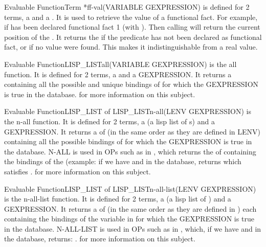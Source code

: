 \begin{typeefa}{Evaluable Function}{Term *}{ff-val}{(VARIABLE GEXPRESSION)}
is defined for 2 terms, a  and a . It is used
to retrieve the value of a functional fact.  For example, if 
has been declared functional fact 1 (with ).  Then
calling  will return the current
 position of the .  It returns the 
 if the predicate has not been declared as functional 
fact, or if no value were found. This makes it indistinguishable from a
 real value.
\end{typeefa}

\begin{typeefa}{Evaluable Function}{LISP\_LIST}{all}{(VARIABLE GEXPRESSION)}
is the all function. It is defined for 2 terms, a  and a
GEXPRESSION.  It returns a  containing all the possible and
unique bindings of  for which the GEXPRESSION is true in the
database.  for more information on
this subject.
\end{typeefa}

\begin{typeefa}{Evaluable Function}{LISP\_LIST of LISP\_LIST}{n-all}{(LENV GEXPRESSION)}
is the n-all function. It is defined for 2 terms, a  (a
lisp list of
s) and a GEXPRESSION. It returns a  of
 (in the same order as they are defined in LENV) containing all
the possible bindings of  for which the GEXPRESSION is true in the
database. N-ALL is used in OPs such as in , which returns the  of 
containing the bindings of the  (example: if we have  and  in the database, returns  which satisfies .  for more information on this subject.
\end{typeefa}

\begin{typeefa}{Evaluable Function}{LISP\_LIST of LISP\_LIST}{n-all-list}{(LENV GEXPRESSION)}
is the n-all-list function. It is defined for 2 terms, a 
(a lisp list of
) and a GEXPRESSION. It returns a  of
 (in the same order as they are defined in ) each
containing the bindings of the variable in  for which the
GEXPRESSION is true in the database.  N-ALL-LIST is used in OPs such as in
, which, if we have
 and  in the database, returns: .  for more
information on this subject. 
\end{typeefa}

